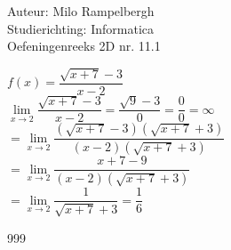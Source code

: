 \documentclass[a4paper]{article}
\newcommand{\fx}{\dfrac{\sqrt{x+7}-3}{x-2}}
\newcommand{\llim}[1]{ \lim\limits_{x \rightarrow #1} }
\begin{document}
\noindent \large Auteur: Milo Rampelbergh \\
\noindent \large Studierichting: Informatica\\
\noindent \large Oefeningenreeks 2D nr. 11.1\\

\medskip

\normalsize


$ f(x) = \fx $ \\

$ \llim{2} \fx = \dfrac{\sqrt{9}-3}{0} = \dfrac{0}{0} = \infty $ \\

$ = \llim{2} \dfrac{(\sqrt{x+7}-3)(\sqrt{x+7}+3)}{(x-2)(\sqrt{x+7}+3)} $ \\

$ = \llim{2} \dfrac{x+7-9}{(x-2)(\sqrt{x+7}+3)} $ \\

$ = \llim{2} \dfrac{1}{\sqrt{x+7}+3} = \dfrac{1}{6} $ \\


\begin{thebibliography}{999}
\end{thebibliography}
\end{document}
